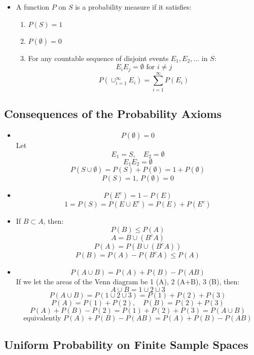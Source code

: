 \begin{itemize}
      \item A function $P$ on $S$ is a probability measure if it satisfies:
            \begin{enumerate}
                  \item $P(S) = 1$
                  \item $P(\emptyset) = 0$
                  \item For any countable sequence of disjoint events $E_1, E_2, ...$ in $S$:
                        \[ E_i E_j = \emptyset \text{ for } i \neq j \]
                        \[ P\left( \cup_{i=1}^{\infty} E_i \right) = \sum_{i=1}^{\infty} P(E_i) \]
            \end{enumerate}
\end{itemize}

\subsection{Consequences of the Probability Axioms}

\begin{itemize}
      \item \[ P(\emptyset) = 0 \]
            Let \[ E_1 = S, \quad E_2 = \emptyset \]
            \[ E_1 E_2 = \emptyset \]
            \[ P(S\cup \emptyset) = P(S) + P(\emptyset) = 1 + P(\emptyset) \]
            \[ P(S) = 1 , \, P(\emptyset) = 0 \]

      \item \[ P(E^c) = 1 - P(E) \]
            \[ 1 = P(S) = P(E\cup E^c ) = P(E) + P(E^c) \]

      \item If $B \subset A$, then:
            \[ P(B) \leq P(A) \]
            \[ A = B \cup (B^c A) \]
            \[ P(A) = P(B \cup (B^c A)) \]
            \[ P(B) = P(A) - P(B^c A) \leq P(A) \]

      \item \[ P(A \cup B) = P(A) + P(B) - P(AB) \]
            If we let the areas of the Venn diagram be 1 (A), 2 (A+B), 3 (B), then:
            \[ A \cup B = 1 \cup 2 \cup 3 \]
            \[ P(A\cup B) = P(1 \cup 2 \cup 3) = P(1) + P(2) + P(3) \]
            \[ P(A) = P(1) + P(2), \quad P(B) = P(2) + P(3) \]
            \[ P(A) + P(B) - P(2)  = P(1) + P(2) + P(3) = P(A \cup B) \]
            \[ \text{equivalently } P(A) + P(B) - P(AB) = P(A) + P(B) - P(AB) \]
\end{itemize}

\subsection{Uniform Probability on Finite Sample Spaces}

